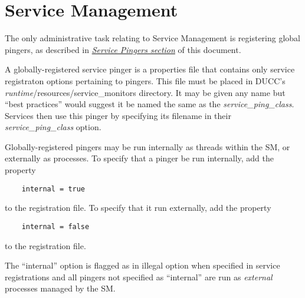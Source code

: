 % 
% 
% 
% 
\ifpdf
\else
{}
\fi
\chapter{Service Management}
\label{chap:sm}
    The only administrative task relating to Service Management is registering
    global pingers, as described in
    \hyperref[subsec:services.pingers]{\em Service Pingers section} of this document.

    A globally-registered service pinger is a properties file that contains only
    service registraton options pertaining to pingers.  This file must be placed
    in DUCC's {\em runtime}/resources/service\_monitors directory.  It may be
    given any name but ``best practices'' would suggest it be named the
    same as the {\em service\_ping\_class}.  Services then use this pinger
    by specifying its filename in their {\em service\_ping\_class} option.
    
    Globally-registered pingers may be run internally as threads within the
    SM, or externally as processes.  To specify that a pinger be run internally,
    add the property 
\begin{verbatim}
    internal = true
\end{verbatim}
    to the registration file.  To specify that it run externally, add the property
\begin{verbatim}
    internal = false
\end{verbatim}
    to the registration file.

    The ``internal'' option is flagged as in illegal option when
    specified in service registrations and all pingers not specified as
    ``internal'' are run as {\em external} processes managed by the SM.

